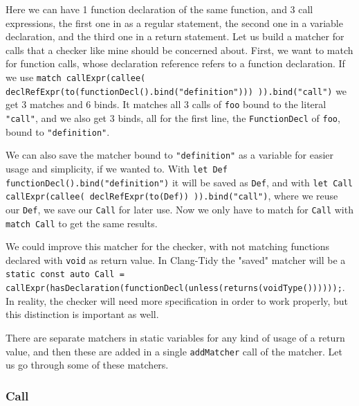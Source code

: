 Here we can have 1 function declaration of the same function, and 3 call expressions, the first one in as a regular statement, the second one in
a variable declaration, and the third one in a return statement. Let us build a matcher for calls that a checker like mine should be
concerned about.
First, we want to match for function calls, whose declaration reference refers to a function declaration. If we use
\texttt{match callExpr(callee( declRefExpr(to(functionDecl().bind("definition"))) )).bind("call")} we get 3 matches
and 6 binds. It matches all 3 calls of \texttt{foo} bound to the literal \texttt{"call"}, and we also get 3 binds, all for the
first line, the \texttt{FunctionDecl} of \texttt{foo}, bound to \texttt{"definition"}.

We can also save the matcher bound to \texttt{"definition"} as a variable for easier usage and simplicity, if we wanted to.
With \texttt{let Def functionDecl().bind("definition")} it will be saved as \texttt{Def}, and with
\texttt{let Call callExpr(callee( declRefExpr(to(Def)) )).bind("call")}, where we reuse our \texttt{Def}, we save our \texttt{Call} for later use. Now we only have
to match for \texttt{Call} with \texttt{match Call} to get the same results.

We could improve this matcher for the checker, with not matching functions declared with \texttt{void} as return value.
In Clang-Tidy the "saved" matcher will be a
\texttt{static const auto Call = callExpr(hasDeclaration(functionDecl(unless(returns(voidType())))));}. In reality, the
checker will need more specification in order to work properly, but this distinction is important as well.

There are separate matchers in static variables for any kind of usage of a return value, and then these are added in a single
\texttt{addMatcher} call of the matcher. Let us go through some of these matchers.

\subsubsection{Call}

